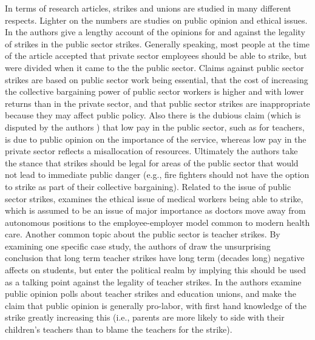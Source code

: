 \documentclass[reqno,11pt]{amsart}
\begin{document}
In terms of research articles, strikes and unions are studied in many
different respects. Lighter on the numbers are studies on public opinion
and ethical issues. In \cite{BurtonCrider} the authors give a lengthy account
of the opinions for and against the legality of strikes in the public sector strikes. 
Generally speaking, most people at the time of the article accepted that private sector 
employees should be able to strike, but were divided when it came to the the public sector.
Claims against public sector strikes are based on public sector work being essential, 
that the cost of increasing the collective bargaining power of public sector workers is higher
and with lower returns than in the private sector, and that public sector strikes are inappropriate 
because they may affect public policy. Also there is the dubious claim (which is disputed by the
authors \cite{BurtonCrider}) that low pay in the public sector, such as for teachers, is due to
public opinion on the importance of the service, whereas low pay in the private sector reflects 
a misallocation of resources. Ultimately the authors take the stance that strikes should be 
legal for areas of the public sector that would not lead to immediate public danger 
(e.g., fire fighters should not have the option to strike as part of their collective bargaining).
Related to the issue of public sector strikes, \cite{ThompsonSalmon} examines the ethical
issue of medical workers being able to strike, which is assumed to be an issue of major
importance as doctors move away from autonomous positions to the employee-employer
model common to modern health care. Another common topic about the public sector
is teacher strikes. By examining one specific case study, the authors of \cite{BelotWebbink}
draw the unsurprising conclusion that long term teacher strikes have long term (decades long) negative
affects on students, but enter the political realm by implying this should be used as
a talking point against the legality of teacher strikes. 
In \cite{HertelFernandezNaiduReich} the authors examine public opinion polls
about teacher strikes and education unions, and make the claim that public opinion
is generally pro-labor, with first hand knowledge of the strike greatly increasing
this (i.e., parents are more likely to side with their children's teachers than
to blame the teachers for the strike).
\end{document}

